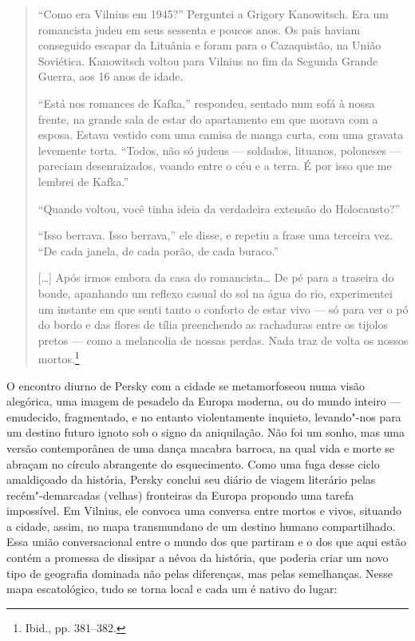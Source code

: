 \begin{quote}
``Como era Vilnius em 1945?'' Perguntei a Grigory Kanowitsch. Era um
romancista judeu em seus sessenta e poucos anos. Os pais haviam
conseguido escapar da Lituânia e foram para o Cazaquistão, na União
Soviética. Kanowitsch voltou para Vilnius no fim da Segunda Grande
Guerra, aos 16 anos de idade.

``Está nos romances de Kafka,'' respondeu, sentado num sofá à nossa
frente, na grande sala de estar do apartamento em que morava com a
esposa. Estava vestido com uma camisa de manga curta, com uma gravata
levemente torta. ``Todos, não só judeus --- soldados, lituanos, poloneses
--- pareciam desenraizados, voando entre o céu e a terra. É por isso que
me lembrei de Kafka.''

``Quando voltou, você tinha ideia da verdadeira extensão do
Holocausto?''

``Isso berrava. Isso berrava,'' ele disse, e repetiu a frase uma
terceira vez. ``De cada janela, de cada porão, de cada buraco.''

[\ldots{}] Após irmos embora da casa do romancista\ldots{} De pé para a
traseira do bonde, apanhando um reflexo casual do sol na água do rio,
experimentei um instante em que senti tanto o conforto de estar vivo ---
só para ver o pó do bordo e das flores de tília preenchendo as
rachaduras entre os tijolos pretos --- como a melancolia de nossas perdas.
Nada traz de volta os nossos mortos.\footnote{Ibid., pp. 381--382.}
\end{quote}

O encontro diurno de Persky com a cidade se metamorfoseou numa visão
alegórica, uma imagem de pesadelo da Europa moderna, ou do mundo inteiro
--- emudecido, fragmentado, e no entanto violentamente inquieto,
levando"-nos para um destino futuro ignoto sob o signo da aniquilação.
Não foi um sonho, mas uma versão contemporânea de uma dança macabra
barroca, na qual vida e morte se abraçam no círculo abrangente do
esquecimento. Como uma fuga desse ciclo amaldiçoado da história, Persky
conclui seu diário de viagem literário pelas recém"-demarcadas (velhas)
fronteiras da Europa propondo uma tarefa impossível. Em Vilnius, ele
convoca uma conversa entre mortos e vivos, situando a cidade, assim, no
mapa transmundano de um destino humano compartilhado. Essa união
conversacional entre o mundo dos que partiram e o dos que aqui estão
contém a promessa de dissipar a névoa da história, que poderia criar um
novo tipo de geografia dominada não pelas diferenças, mas pelas
semelhanças. Nesse mapa escatológico, tudo se torna local e cada um é
nativo do lugar:

